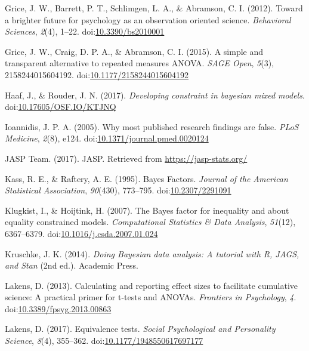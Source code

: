 \documentclass[,man, mask]{apa6}
\begin{document}
\leavevmode\hypertarget{ref-Grice2012}{}%
Grice, J. W., Barrett, P. T., Schlimgen, L. A., \& Abramson, C. I. (2012). Toward a brighter future for psychology as an observation oriented science. \emph{Behavioral Sciences}, \emph{2}(4), 1--22. doi:\href{https://doi.org/10.3390/bs2010001}{10.3390/bs2010001}

\leavevmode\hypertarget{ref-Grice2015}{}%
Grice, J. W., Craig, D. P. A., \& Abramson, C. I. (2015). A simple and transparent alternative to repeated measures ANOVA. \emph{SAGE Open}, \emph{5}(3), 2158244015604192. doi:\href{https://doi.org/10.1177/2158244015604192}{10.1177/2158244015604192}

\leavevmode\hypertarget{ref-Haaf2017}{}%
Haaf, J., \& Rouder, J. N. (2017). \emph{Developing constraint in bayesian mixed models}. doi:\href{https://doi.org/10.17605/OSF.IO/KTJNQ}{10.17605/OSF.IO/KTJNQ}

\leavevmode\hypertarget{ref-Ioannidis2005}{}%
Ioannidis, J. P. A. (2005). Why most published research findings are false. \emph{PLoS Medicine}, \emph{2}(8), e124. doi:\href{https://doi.org/10.1371/journal.pmed.0020124}{10.1371/journal.pmed.0020124}

\leavevmode\hypertarget{ref-JASPTeam2017}{}%
JASP Team. (2017). JASP. Retrieved from \url{https://jasp-stats.org/}

\leavevmode\hypertarget{ref-Kass1995}{}%
Kass, R. E., \& Raftery, A. E. (1995). Bayes Factors. \emph{Journal of the American Statistical Association}, \emph{90}(430), 773--795. doi:\href{https://doi.org/10.2307/2291091}{10.2307/2291091}

\leavevmode\hypertarget{ref-Klugkist2007}{}%
Klugkist, I., \& Hoijtink, H. (2007). The Bayes factor for inequality and about equality constrained models. \emph{Computational Statistics \& Data Analysis}, \emph{51}(12), 6367--6379. doi:\href{https://doi.org/10.1016/j.csda.2007.01.024}{10.1016/j.csda.2007.01.024}

\leavevmode\hypertarget{ref-Kruschke2014}{}%
Kruschke, J. K. (2014). \emph{Doing Bayesian data analysis: A tutorial with R, JAGS, and Stan} (2nd ed.). Academic Press.

\leavevmode\hypertarget{ref-Lakens2013}{}%
Lakens, D. (2013). Calculating and reporting effect sizes to facilitate cumulative science: A practical primer for t-tests and ANOVAs. \emph{Frontiers in Psychology}, \emph{4}. doi:\href{https://doi.org/10.3389/fpsyg.2013.00863}{10.3389/fpsyg.2013.00863}

\leavevmode\hypertarget{ref-Lakens2017a}{}%
Lakens, D. (2017). Equivalence tests. \emph{Social Psychological and Personality Science}, \emph{8}(4), 355--362. doi:\href{https://doi.org/10.1177/1948550617697177}{10.1177/1948550617697177}
\end{document}
